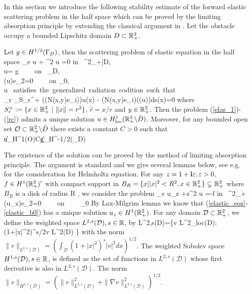 \documentclass[12pt]{iopart}
\begin{document}
In this section we introduce the following stability estimate of the forward elastic scattering problem in the half space which can be proved by the limiting absorption principle by extending the classical argument in \cite{leis,wilcox1975,Yves1988}. Let the obstacle occupy a bounded Lipschitz domain $D\subset {\mathbb{R}}^2_+$.
\begin{thm} \label{elastic_eq2}
	Let $g \in H^{1/2}(\Gamma_D)$, then the scattering problem of elastic equation in the half space
	\be
	\Delta_e u + \omega^2 u =0 \qquad\mbox{\rm in } \R^2_+\bks \bar{D}, \label{elas_1}\ \ \
	\\ u= g \ \ \ \ \mbox{\rm on } \Ga_D, \label{elas_bd} \\
	\sigma(u)e_2=0 \ \ \ \ \mbox{\rm on} \Ga_0, \label{elas_b0} \\
	u \ \mbox{satisfies the generalized radiation codition\cite{Guzina2006} such that} \nn \\\label{rc}
	\lim_{r\to\infty}  \int_{S_r^+} (\sigma(N(x,y)e_i))\cdot u(x) - (N(x,y)e_i)\cdot (\sigma(u)\hat{r})ds(x)=0
	\ee
	where $S_r^+:=\{x\in {\mathbb{R}}^2_+ \ | \ \|x\|=r^2\}$, $\hat{r}=x/r$ and $y\in {\mathbb{R}}_+^2$. Then the problem (\ref{elas_1})-(\ref{rc})
	admits a unique solution $u \in H^{1}_{\rm loc}({\mathbb{R}}^2_+ \backslash \bar D)$. Moreover, for any bounded open set $\mathcal O\subset {\mathbb{R}}^2_+\backslash\bar D$ there exists a constant $C>0$ such that
	\be \label{elas_ineq}
	\|u\|_{H^{1}(\mathcal O)}\le C\|g\|_{H^{-1/2}(\Ga_D)}
	\ee
\end{thm}
The existence of the solution can be proved by the method of limiting absorption principle. The argument is standard and we give several lemmas below, see e.g. \cite{leis} for the consideration for Helmholtz equation. For any $z=1+\mathbf{i}\varepsilon,\varepsilon>0$, $f\in H^{1}({\mathbb{R}}^2_+)'$ with compact support in $B_R=\{x||x|^2<R^2,x\in{\mathbb{R}}^2_+\}\subsetneq{\mathbb{R}}_+^2$ where $B_R$ is a disk of radius R , we consider the problem
\be \label{elastic_eqz}
\Delta_e u_z +z\omega^2 u =-f \qquad\mbox{\rm in } \R^2_+ \\
\sigma(u_z)e_2=0 \ \ \ \ \mbox{\rm on} \ \ \ \  \Ga_0 \label{elastic_b0}
\ee
By Lax-Milgrim lemma we know that (\ref{elastic_eqz}-\ref{elastic_b0}) has a unique solution $u_z\in H^1({\mathbb{R}}^2_+)$. For any domain $\mathcal D \subset {\mathbb{R}}^2_+$, we define the weighted space $L^{2,s}(\mathcal D),s \in {\mathbb{R}}$, by
\ben
L^{2,s}(\mathcal D)=\{v \in L^2_{\rm loc}(\mathcal D): (1+|x|^2)^{s/2}v \in L^2(\mathcal D) \}
\een
with the norm $\| v \|_{ L^{2,s}(\mathcal D)} = (\int_{\mathcal D}(1+|x|^2)^{s}|v|^2 dx )^{1/2}$. The weighted Sobolev space $H^{1,s}(\mathcal D),s \in {\mathbb{R}}$,
is defined as the set of functions in $L^{2,s}(\mathcal D)$ whose first derivative is also in $L^{2,s}(\mathcal D)$. The norm
$\| v \|_{ H^{1,s}(\mathcal D)} = (\| v \|^2_{ L^{2,s} (\mathcal D)} + \| \nabla v \|^2_{ L^{2,s}(\mathcal D)})^{1/2}$.
\end{document}
